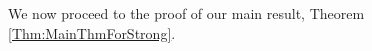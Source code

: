 \documentclass{article}
\theoremstyle{definition}
\theoremstyle{plain}
\begin{document}

We now proceed to the proof of our main result, Theorem \ref{Thm:MainThmForStrong}. 
\end{document}
